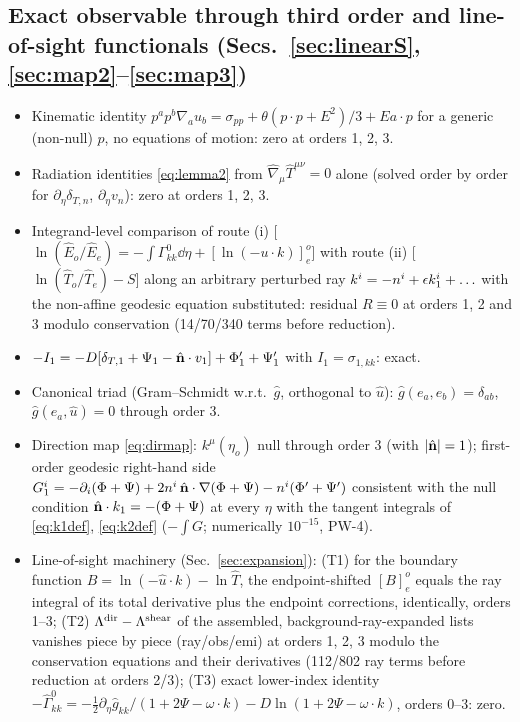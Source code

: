 \subsection*{Exact observable through third order and line-of-sight functionals (Secs.~\ref{sec:linearS}, \ref{sec:map2}--\ref{sec:map3})}
\begin{itemize}\itemsep1pt
\item[X-7] Kinematic identity $p^ap^b\nabla_au_b=\sigma_{pp}+\theta(p\cdot p+E^2)/3+Ea\cdot p$ for a generic (non-null) $p$, no equations of motion: zero at orders 1, 2, 3.
\item[X-8] Radiation identities \eqref{eq:lemma2} from $\hat\nabla_\mu\hat T^{\mu\nu}=0$ alone (solved order by order for $\partial_\eta\delta_{T,n}$, $\partial_\eta v_n$): zero at orders 1, 2, 3.
\item[X-9] Integrand-level comparison of route (i) [$\ln(\hat E_o/\hat E_e)=-\int\Gamma^0_{kk}\dd\eta+[\ln(-u\cdot k)]^o_e$] with route (ii) [$\ln(\hat T_o/\hat T_e)-S$] along an arbitrary perturbed ray $k^i=-n^i+\epsilon k_1^i+\ldots$ with the non-affine geodesic equation substituted: residual $R\equiv0$ at orders 1, 2 and 3 modulo conservation (14/70/340 terms before reduction).
\item[R-1] $-I_1=-D[\delta_{T,1}+\Psi_1-\hat{\mathbf n}\cdot v_1]+\Phi_1'+\Psi_1'$ with $I_1=\sigma_{1,kk}$: exact.
\item[R-2] Canonical triad (Gram--Schmidt w.r.t.\ $\hat g$, orthogonal to $\hat u$): $\hat g(e_a,e_b)=\delta_{ab}$, $\hat g(e_a,\hat u)=0$ through order 3.
\item[R-3] Direction map \eqref{eq:dirmap}: $k^\mu(\eta_o)$ null through order 3 (with $|\hat{\mathbf n}|=1$); first-order geodesic right-hand side $G_1^i=-\partial_i(\Phi+\Psi)+2n^i\,\hat{\mathbf n}\cdot\nabla(\Phi+\Psi)-n^i(\Phi'+\Psi')$ consistent with the null condition $\hat{\mathbf n}\cdot k_1=-(\Phi+\Psi)$ at every $\eta$ with the tangent integrals of \eqref{eq:k1def}, \eqref{eq:k2def} ($-\int G$; numerically $10^{-15}$, PW-4).
\item[R-4] Line-of-sight machinery (Sec.~\ref{sec:expansion}): (T1) for the boundary function $B=\ln(-\hat u\cdot k)-\ln\hat T$, the endpoint-shifted $[B]^o_e$ equals the ray integral of its total derivative plus the endpoint corrections, identically, orders 1--3; (T2) $\Lambda^{\rm dir}-\Lambda^{\rm shear}$ of the assembled, background-ray-expanded lists vanishes piece by piece (ray/obs/emi) at orders 1, 2, 3 modulo the conservation equations and their derivatives (112/802 ray terms before reduction at orders 2/3); (T3) exact lower-index identity $-\hat\Gamma^0_{kk}=-\tfrac12\partial_\eta\hat g_{kk}/(1+2\Psi-\omega\cdot k)-D\ln(1+2\Psi-\omega\cdot k)$, orders 0--3: zero.  

\end{itemize}
